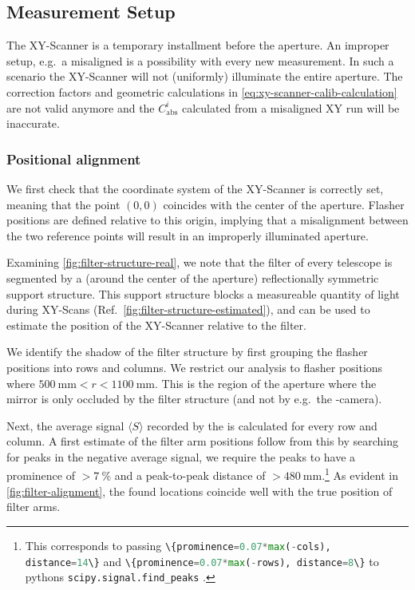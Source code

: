 \subsection{Measurement Setup}

The XY-Scanner is a temporary installment before the \FD aperture. An improper 
setup, e.g.~a misaligned \CLS is a possibility with every new measurement. In 
such a scenario the XY-Scanner will not (uniformly) illuminate the entire \FD
aperture. The correction factors and geometric calculations in 
\cref{eq:xy-scanner-calib-calculation} are not valid anymore and the 
$C^i_\mathrm{abs}$ calculated from a misaligned XY run will be inaccurate.

\subsubsection{Positional alignment}
\label{sssec:xy-qa-filter-estimation}

We first check that the coordinate system of the XY-Scanner is correctly set,
meaning that the point $(0, 0)$ coincides with the center of the \FD aperture. 
Flasher positions are defined relative to this origin, implying that a 
misalignment between the two reference points will result in an improperly 
illuminated aperture.

Examining \cref{fig:filter-structure-real}, we note that the \UV filter of every
\FD telescope is segmented by a (around the center of the aperture) 
reflectionally symmetric support structure. This support structure blocks a 
measureable quantity of light during XY-Scans 
(Ref.~\cref{fig:filter-structure-estimated}), and can be used to estimate the 
position of the XY-Scanner relative to the \FD filter.

We identify the shadow of the filter structure by first grouping the flasher 
positions into rows and columns. We restrict our analysis to flasher positions 
where $\SI{500}{\milli\meter} < r < \SI{1100}{\milli\meter}$. This is the region
of the aperture where the \FD mirror is only occluded by the filter structure 
(and not by e.g.~the \FD-camera).

Next, the average signal $\langle S \rangle$ recorded by the \FD is calculated 
for every row and column. A first estimate of the filter arm positions follow 
from this by searching for peaks in the negative average signal, we require the 
peaks to have a prominence of $>\SI{7}{\percent}$ and a peak-to-peak distance of
$>\SI{480}{\milli\meter}$.\footnote{This corresponds to passing 
\lstinline[language=python]|\{prominence=0.07*max(-cols), distance=14\}| and
\lstinline[language=python]|\{prominence=0.07*max(-rows), distance=8\}| to 
pythons \lstinline[language=python]|scipy.signal.find_peaks|
\cite{virtanenSciPy10Fundamental2020}.} As evident in 
\cref{fig:filter-alignment}, the found locations coincide well with the true 
position of filter arms.

